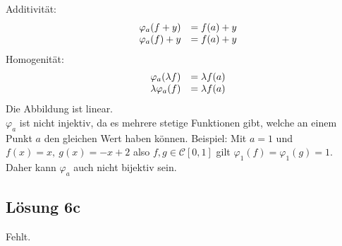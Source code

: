 \documentclass[main.tex]{subfiles}
\begin{document}
Additivität:
\begin{equation*}
    \begin{array}{ r r l }
     & \varphi _{a}( f+y) & =f( a) +y\\
     & \varphi _{a}( f) +y & =f( a) +y
    \end{array}
\end{equation*}
Homogenität:
\begin{equation*}
    \begin{array}{ r r l }
     & \varphi _{a}( \lambda f) & =\lambda f( a)\\
     & \lambda \varphi _{a}( f) & =\lambda f( a)
    \end{array}
\end{equation*}
Die Abbildung ist linear.\\

$\varphi _{a}$ ist nicht injektiv, da es mehrere stetige Funktionen gibt, welche an einem Punkt $a$ den gleichen Wert haben können. Beispiel: Mit $a=1$ und $f( x) =x,\ g( x) =-x+2$ also $f,g\in \mathcal{C}[ 0,1]$ gilt $\varphi _{1}( f) =\varphi _{1}( g) =1.$\\

Daher kann $\varphi _{a}$ auch nicht bijektiv sein.


\subsection{Lösung 6c}
Fehlt.
\end{document}
